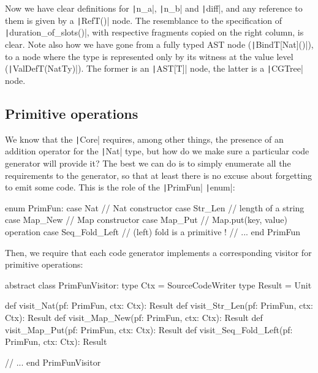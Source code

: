 \documentclass[11pt]{article}
\newcommand{\ScalaI}[1]{\texttt|#1|}
\begin{document}
\noindent Now we have clear definitions for \ScalaI{n_a}, \ScalaI{n_b} and \ScalaI{diff}, and any reference to them is given by a \ScalaI{RefT()} node. The resemblance to the specification of \ScalaI{duration_of_slots()}, with respective fragments copied on the right column, is clear. Note also how we have gone from a fully typed AST node (\ScalaI{BindT[Nat]()}), to a node where the type is represented only by its witness at the value level (\ScalaI{ValDefT(NatTy)}). The former is an \ScalaI{AST[T]} node, the latter is a \ScalaI{CGTree} node.

\subsection{Primitive operations}
We know that the \ScalaI{Core} requires, among other things, the presence of an addition operator for the \ScalaI{Nat} type, but how do we make sure a particular code generator will provide it? The best we can do is to simply enumerate all the requirements to the generator, so that at least there is no excuse about forgetting to emit some code. This is the role of the \ScalaI{PrimFun} \ScalaI{enum}:

\begin{ScalaBlockSimple}
enum PrimFun:
  case Nat           // Nat constructor
  case Str_Len       // length of a string
  case Map_New       // Map constructor
  case Map_Put       // Map.put(key, value) operation
  case Seq_Fold_Left // (left) fold is a primitive !
  // ...
end PrimFun
\end{ScalaBlockSimple}

\noindent Then, we require that each code generator implements a corresponding visitor for primitive operations:

\begin{ScalaBlockSimple}
abstract class PrimFunVisitor:
  type Ctx = SourceCodeWriter
  type Result = Unit

  def visit_Nat(pf: PrimFun, ctx: Ctx): Result
  def visit_Str_Len(pf: PrimFun, ctx: Ctx): Result
  def visit_Map_New(pf: PrimFun, ctx: Ctx): Result
  def visit_Map_Put(pf: PrimFun, ctx: Ctx): Result
  def visit_Seq_Fold_Left(pf: PrimFun, ctx: Ctx): Result
  
  // ...
end PrimFunVisitor
\end{ScalaBlockSimple}

\end{document}
